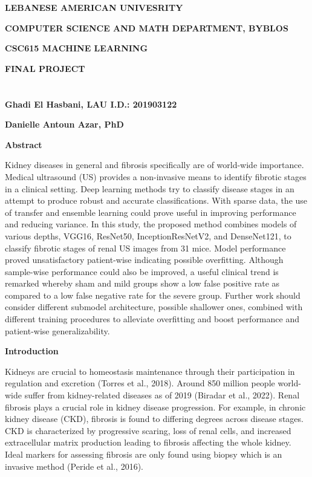 \documentclass[
]{article}
\author{}
\date{}
\begin{document}
\textbf{LEBANESE AMERICAN UNIVESRITY}

\textbf{COMPUTER SCIENCE AND MATH DEPARTMENT, BYBLOS}

\textbf{CSC615 MACHINE LEARNING}

\textbf{FINAL PROJECT\\
~\\
~\\
Ghadi El Hasbani, LAU I.D.: 201903122\\
}

\textbf{Danielle Antoun Azar, PhD}

\textbf{Abstract}

Kidney diseases in general and fibrosis specifically are of world-wide
importance. Medical ultrasound (US) provides a non-invasive means to
identify fibrotic stages in a clinical setting. Deep learning methods
try to classify disease stages in an attempt to produce robust and
accurate classifications. With sparse data, the use of transfer and
ensemble learning could prove useful in improving performance and
reducing variance. In this study, the proposed method combines models of
various depths, VGG16, ResNet50, InceptionResNetV2, and DenseNet121, to
classify fibrotic stages of renal US images from 31 mice. Model
performance proved unsatisfactory patient-wise indicating possible
overfitting. Although sample-wise performance could also be improved, a
useful clinical trend is remarked whereby sham and mild groups show a
low false positive rate as compared to a low false negative rate for the
severe group. Further work should consider different submodel
architecture, possible shallower ones, combined with different training
procedures to alleviate overfitting and boost performance and
patient-wise generalizability.

\textbf{Introduction}

Kidneys are crucial to homeostasis maintenance through their
participation in regulation and excretion (Torres et al., 2018). Around
850 million people world-wide suffer from kidney-related diseases as of
2019 (Biradar et al., 2022). Renal fibrosis plays a crucial role in
kidney disease progression. For example, in chronic kidney disease
(CKD), fibrosis is found to differing degrees across disease stages. CKD
is characterized by progressive scaring, loss of renal cells, and
increased extracellular matrix production leading to fibrosis affecting
the whole kidney. Ideal markers for assessing fibrosis are only found
using biopsy which is an invasive method (Peride et al., 2016).
\end{document}
